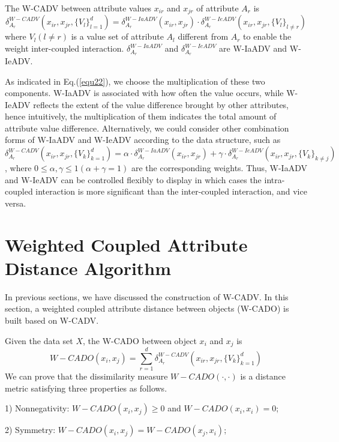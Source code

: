 \documentclass[review]{elsarticle}
\begin{document}
The W-CADV between attribute values $x_{ir}$ and $x_{jr}$ of attribute $A_r$ is
\begin{equation}
\delta_{A_r}^{W-CADV}(x_{ir},x_{jr},\{V_l\}_{l = 1} ^ d) = \delta_{A_r}^{W-IaADV}(x_{ir},x_{jr}) \cdot \delta_{A_r}^{W-IeADV}(x_{ir},x_{jr},\{V_l\}_{l \neq r})
\label{equ22}
\end{equation}
where $V_l (l \neq r)$ is a value set of attribute $A_l$ different from $A_r$ to enable the weight inter-coupled interaction. $\delta_{A_r}^{W-IaADV}$ and $\delta_{A_r}^{W-IeADV}$ are W-IaADV and W-IeADV.

As indicated in Eq.(\ref{equ22}), we choose the multiplication of these two components. W-IaADV is associated with how often the value occurs, while W-IeADV reflects the extent of the value difference brought by other attributes, hence intuitively, the multiplication of them indicates the total amount of attribute value difference. Alternatively, we could consider other combination forms of W-IaADV and W-IeADV according to the data structure, such as $\delta_{A_r}^{W-CADV}(x_{ir},x_{jr},\{V_k\}_{k = 1} ^ d) = \alpha \cdot \delta_{A_r}^{W-IaADV}(x_{ir},x_{jr}) + \gamma \cdot \delta_{A_r}^{W-IeADV}(x_{ir},x_{jr},\{V_k\}_{k \neq j})$, where $0 \leq \alpha,\gamma \leq 1 (\alpha+\gamma = 1)$
are the corresponding weights. Thus, W-IaADV and W-IeADV can be controlled flexibly to display in which cases the intra-coupled interaction is more significant than the inter-coupled interaction, and vice versa.

\section{Weighted Coupled Attribute Distance Algorithm}
In previous sections, we have discussed the construction of W-CADV. In this section, a weighted coupled attribute distance between objects (W-CADO) is built based on W-CADV.

Given the data set $X$, the W-CADO between object $x_i$ and $x_j$ is
\begin{equation}
W-CADO(x_i,x_j) = \sum_{r=1}^{d}\delta_{A_r}^{W-CADV}(x_{ir},x_{jr},\{V_k\}_{k = 1} ^ d)
\label{equ23}
\end{equation}
We can prove that the dissimilarity measure $W-CADO(\cdot,\cdot)$ is a distance metric satisfying three properties as follows.

1) Nonnegativity: $W-CADO(x_i,x_j) \geq 0$ and $W-CADO(x_i,x_i) = 0$;

2) Symmetry: $W-CADO(x_i,x_j) = W-CADO(x_j,x_i)$;
\end{document}
